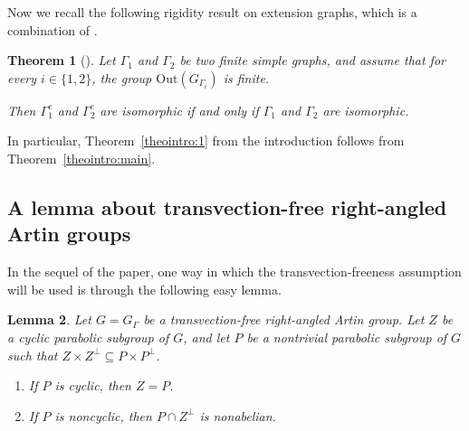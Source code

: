 \documentclass[11pt]{article}
\numberwithin{equation}{section}
\theoremstyle{plain}
\newtheorem{theo}{Theorem}[section]
\newtheorem{lemma}[theo]{Lemma}
\theoremstyle{definition}
\newcommand{\Out}{\mathrm{Out}}
\begin{document}
Now we recall the following rigidity result on extension graphs, which is a combination of \cite[Cor.\,4.16 and Lemma 4.17]{Hua}.

\begin{theo}[\cite{Hua}]\label{theo:rigidity}
Let $\Gamma_1$ and $\Gamma_2$ be two finite simple graphs, and assume that for every $i\in\{1,2\}$, the group $\Out(G_{\Gamma_i})$ is finite.

Then $\Gamma_1^e$ and $\Gamma_2^e$ are isomorphic if and only if $\Gamma_1$ and $\Gamma_2$ are isomorphic.
\end{theo}

In particular, Theorem~\ref{theointro:1} from the introduction follows from Theorem~\ref{theointro:main}.

\subsection{A lemma about transvection-free right-angled Artin groups}\label{sec:transvection-free}

In the sequel of the paper, one way in which the transvection-freeness assumption will be used is through the following easy lemma.

\begin{lemma}\label{lemma:transvection-free}
Let $G=G_\Gamma$ be a transvection-free right-angled Artin group. Let $Z$ be a cyclic parabolic subgroup of $G$, and let $P$ be a nontrivial parabolic subgroup of $G$ such that $Z\times Z^{\perp}\subseteq P\times P^{\perp}$.
\begin{enumerate}
\item If $P$ is cyclic, then $Z=P$.
\item If $P$ is noncyclic, then $P\cap Z^{\perp}$ is nonabelian.
\end{enumerate}
\end{lemma}
\end{document}
